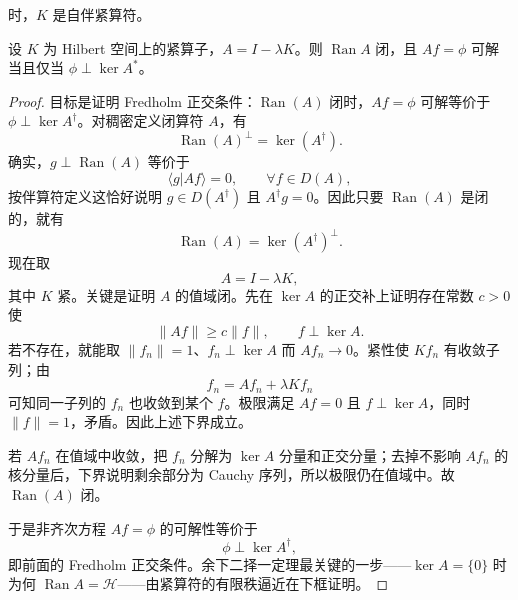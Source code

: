 时，$K$ 是自伴紧算符。
\begin{proposition}[紧扰动恒等算子的闭值域与正交条件]
设 $K$ 为 Hilbert 空间上的紧算子，$A=I-\lambda K$。则 $\operatorname{Ran}A$ 闭，且 $Af=\phi$ 可解当且仅当 $\phi\perp\ker A^*$。
\end{proposition}
\begin{proof}
目标是证明 Fredholm 正交条件：$\operatorname{Ran}(A)$ 闭时，$Af=\phi$ 可解等价于 $\phi\perp\ker A^\dagger$。对稠密定义闭算符 $A$，有
\[
\operatorname{Ran}(A)^\perp=\ker(A^\dagger).
\]
确实，$g\perp\operatorname{Ran}(A)$ 等价于
\[
\langle g|Af\rangle=0,
\qquad \forall f\in D(A),
\]
按伴算符定义这恰好说明 $g\in D(A^\dagger)$ 且 $A^\dagger g=0$。因此只要 $\operatorname{Ran}(A)$ 是闭的，就有
\[
\operatorname{Ran}(A)=\ker(A^\dagger)^\perp.
\]
现在取
\[
A=I-\lambda K,
\]
其中 $K$ 紧。关键是证明 $A$ 的值域闭。先在 $\ker A$ 的正交补上证明存在常数 $c>0$ 使
\[
\|Af\|\ge c\|f\|,
\qquad f\perp\ker A.
\]
若不存在，就能取 $\|f_n\|=1$、$f_n\perp\ker A$ 而 $Af_n\to0$。紧性使 $Kf_n$ 有收敛子列；由
\[
f_n=Af_n+\lambda Kf_n
\]
可知同一子列的 $f_n$ 也收敛到某个 $f$。极限满足 $Af=0$ 且 $f\perp\ker A$，同时 $\|f\|=1$，矛盾。因此上述下界成立。

若 $Af_n$ 在值域中收敛，把 $f_n$ 分解为 $\ker A$ 分量和正交分量；去掉不影响 $Af_n$ 的核分量后，下界说明剩余部分为 Cauchy 序列，所以极限仍在值域中。故 $\operatorname{Ran}(A)$ 闭。

于是非齐次方程 $Af=\phi$ 的可解性等价于
\[
\phi\perp\ker A^\dagger,
\]
即前面的 Fredholm 正交条件。余下二择一定理最关键的一步——$\ker A=\{0\}$ 时为何 $\operatorname{Ran}A=\mathcal H$——由紧算符的有限秩逼近在下框证明。
\end{proof}


